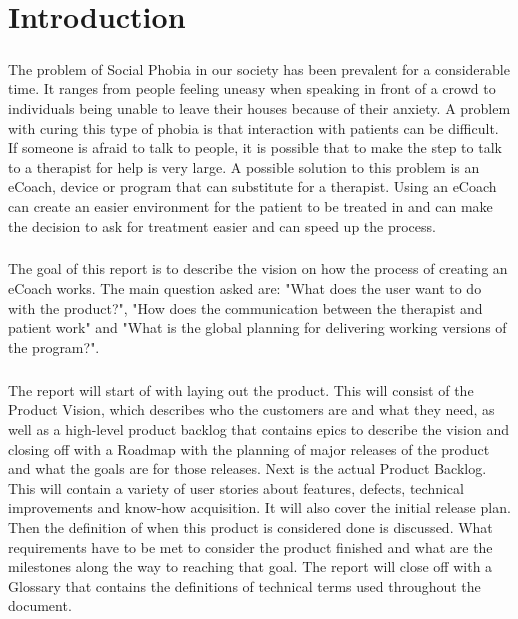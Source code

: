 \chapter{Introduction}

\paragraph{}
The problem of Social Phobia in our society has been prevalent for a considerable time. It ranges from people feeling uneasy when speaking in front of a crowd to individuals being unable to leave their houses because of their anxiety. 
A problem with curing this type of phobia is that interaction with patients can be difficult. If someone is afraid to talk to people, it is possible that to make the step to talk to a therapist for help is very large. A possible solution to this problem is an \gls{eCoach}, device or program that can substitute for a therapist. Using an \gls{eCoach} can create an easier environment for the patient to be treated in and can make the decision to ask for treatment easier and can speed up the process.
\paragraph{}
The goal of this report is to describe the vision on how the process of creating an \gls{eCoach} works. The main question asked are: "What does the user want to do with the product?", "How does the communication between the therapist and patient work" and "What is the global planning for delivering working versions of the program?".
\paragraph{}
The report will start of with laying out the product. This will consist of the Product Vision, which describes who the customers are and what they need, as well as a high-level product backlog that contains epics to describe the vision and closing off with a Roadmap with the planning of major releases of the product and what the goals are for those releases.
Next is the actual Product Backlog. This will contain a variety of user stories about features, defects, technical improvements and know-how acquisition. It will also cover the initial release plan.
Then the definition of when this product is considered done is discussed. What requirements have to be met to consider the product finished and what are the milestones along the way to reaching that goal.
The report will close off with a Glossary that contains the definitions of technical terms used throughout the document.